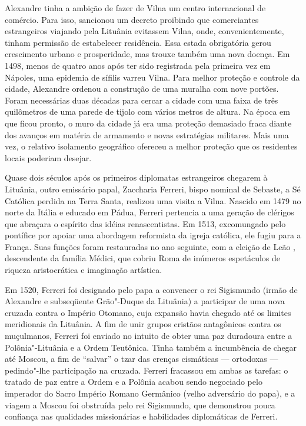 Alexandre tinha a ambição de fazer de Vilna um centro internacional de
comércio. Para isso, sancionou um decreto proibindo que comerciantes
estrangeiros viajando pela Lituânia evitassem Vilna, onde,
convenientemente, tinham permissão de estabelecer residência. Essa
estada obrigatória gerou crescimento urbano e prosperidade, mas trouxe
também uma nova doença. Em 1498, menos de quatro anos após ter sido
registrada pela primeira vez em Nápoles, uma epidemia de sífilis varreu
Vilna. Para melhor proteção e controle da cidade, Alexandre ordenou a
construção de uma muralha com nove portões. Foram necessárias duas
décadas para cercar a cidade com uma faixa de três quilômetros de uma
parede de tijolo com vários metros de altura. Na época em que ficou
pronto, o muro da cidade já era uma proteção demasiado fraca diante dos
avanços em matéria de armamento e novas estratégias militares. Mais uma
vez, o relativo isolamento geográfico ofereceu a melhor proteção que os
residentes locais poderiam desejar.

Quase dois séculos após os primeiros diplomatas estrangeiros chegarem à
Lituânia, outro emissário papal, Zaccharia Ferreri, bispo nominal de
Sebaste, a Sé Católica perdida na Terra Santa, realizou uma visita a
Vilna. Nascido em 1479 no norte da Itália e educado em Pádua, Ferreri
pertencia a uma geração de clérigos que abraçara o espírito das idéias
renascentistas. Em 1513, excomungado pelo pontífice por apoiar uma
abordagem reformista da igreja católica, ele fugiu para a França. Suas
funções foram restauradas no ano seguinte, com a eleição de Leão ,
descendente da família Médici, que cobriu Roma de inúmeros espetáculos
de riqueza aristocrática e imaginação artística.

%

Em 1520, Ferreri foi designado pelo papa a convencer o rei Sigismundo
(irmão de Alexandre e subseqüente Grão"-Duque da Lituânia) a participar
de uma nova cruzada contra o Império Otomano, cuja expansão havia
chegado até os limites meridionais da Lituânia. A fim de unir grupos
cristãos antagônicos contra os muçulmanos, Ferreri foi enviado no
intuito de obter uma paz duradoura entre a Polônia"-Lituânia e a Ordem
Teutônica. Tinha também a incumbência de chegar até Moscou, a fim de
``salvar'' o tzar das crenças cismáticas --- ortodoxas --- pedindo"-lhe
participação na cruzada. Ferreri fracassou em ambas as tarefas: o
tratado de paz entre a Ordem e a Polônia acabou sendo negociado pelo
imperador do Sacro Império Romano Germânico (velho adversário do papa),
e a viagem a Moscou foi obstruída pelo rei Sigismundo, que demonstrou
pouca confiança nas qualidades missionárias e habilidades diplomáticas
de Ferreri.

